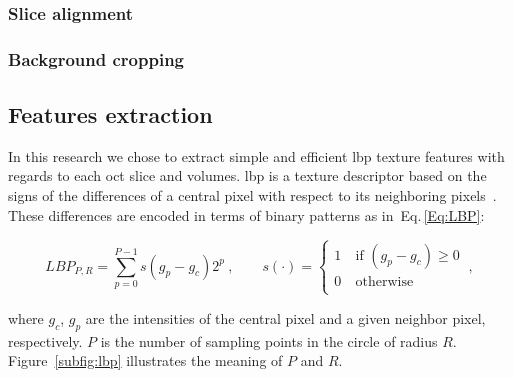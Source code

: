 \subsubsection{Slice alignment}

\subsubsection{Background cropping}

\subsection{Features extraction}\label{subsec:feaext}
{\color{red}In this research we chose to extract simple and efficient \ac{lbp} texture features with regards to each \ac{oct} slice and volumes.}
\ac{lbp} is a texture descriptor based on the signs of the differences of a central pixel with respect to its neighboring pixels~\cite{ojala2002multiresolution}. 
These differences are encoded in terms of binary patterns as in~Eq.\,\eqref{Eq:LBP}: 

\begin{equation}\label{Eq:LBP}
LBP_{P,R} = \sum_{p=0}^{P-1}s(g_{p} - g_{c})2^{p} \ , \qquad s(\cdot) = \begin{cases}
    1  & \ \text{if } (g_{p} - g_{c}) \geq 0\\
    0  & \ \text{otherwise}\\
  \end{cases} \ ,
\end{equation}

\noindent where $g_c$, $g_{p}$ are the intensities of the central pixel and a given neighbor pixel, respectively. $P$ is the number of sampling points in the circle of radius $R$. Figure~\ref{subfig:lbp} illustrates the meaning of $P$ and $R$.

